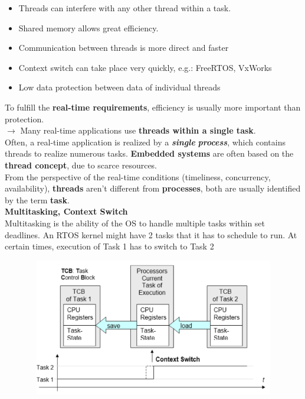 \begin{itemize}
	\item Threads can interfere with any other thread within a task.
	\item Shared memory allows great efficiency.
	\item Communication between threads is more direct and faster
	\item Context switch can take place very quickly, e.g.: FreeRTOS, VxWorks
	\item Low data protection between data of individual threads
\end{itemize}

To fulfill the \textbf{real-time requirements}, efficiency is usually more important than protection. \\

$\rightarrow$ Many real-time applications use \textbf{threads within a single task}.\\

Often, a real-time application is realized by a \textbf{\textit{single}} \textbf{\textit{process}}, which contains threads to realize numerous tasks.\textbf{ Embedded systems} are often based on the \textbf{thread concept}, due to scarce resources.\\

From the perspective of the real-time conditions (timeliness, concurrency, availability), \textbf{threads} aren't different from \textbf{processes}, both are usually identified by the term \textbf{task}.\\

{\rot\bf Multitasking, Context Switch }\\

Multitasking is the ability of the OS to handle multiple tasks within set deadlines. An RTOS kernel might have 2 tasks that it has to schedule to run. At certain times, execution of Task 1 has to switch to Task 2

	\begin{figure}[h]
    \centering
    \includegraphics[width=13cm, height=6cm]{Images/image81.png}
    \label{fig:Fig }
    \end{figure}

